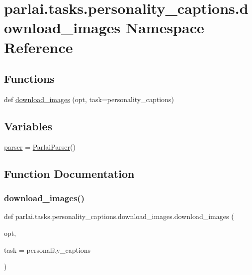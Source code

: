 \hypertarget{namespaceparlai_1_1tasks_1_1personality__captions_1_1download__images}{}\section{parlai.\+tasks.\+personality\+\_\+captions.\+download\+\_\+images Namespace Reference}
\label{namespaceparlai_1_1tasks_1_1personality__captions_1_1download__images}
\subsection*{Functions}
\begin{DoxyCompactItemize}
\item 
def \hyperlink{namespaceparlai_1_1tasks_1_1personality__captions_1_1download__images_a9d812a095ca6d48541b3d5cdc65a4bf3}{download\+\_\+images} (opt, task=\textquotesingle{}personality\+\_\+captions\textquotesingle{})
\end{DoxyCompactItemize}
\subsection*{Variables}
\begin{DoxyCompactItemize}
\item 
\hyperlink{namespaceparlai_1_1tasks_1_1personality__captions_1_1download__images_ad569e6f3e90709b66c27bc16b83e9275}{parser} = \hyperlink{classparlai_1_1core_1_1params_1_1ParlaiParser}{Parlai\+Parser}()
\end{DoxyCompactItemize}


\subsection{Function Documentation}
\mbox{\label{namespaceparlai_1_1tasks_1_1personality__captions_1_1download__images_a9d812a095ca6d48541b3d5cdc65a4bf3}} 
\subsubsection{\texorpdfstring{download\+\_\+images()}{download\_images()}}
{\footnotesize\ttfamily def parlai.\+tasks.\+personality\+\_\+captions.\+download\+\_\+images.\+download\+\_\+images (\begin{DoxyParamCaption}\item[{}]{opt,  }\item[{}]{task = {\ttfamily \textquotesingle{}personality\+\_\+captions\textquotesingle{}} }\end{DoxyParamCaption})}



